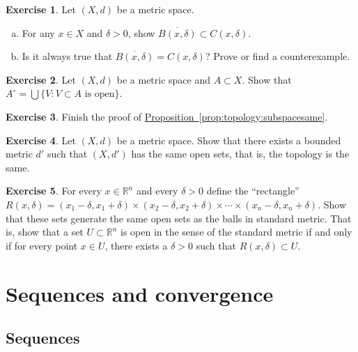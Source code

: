 \documentclass[12pt,openany]{book}
\newcommand{\R}{{\mathbb{R}}}
\theoremstyle{plain}
\theoremstyle{remark}
\theoremstyle{definition}
\newenvironment{exbox}{%
    \def\FrameCommand{\vrule width 1pt \relax\hspace{10pt}}%
    \MakeFramed{\advance\hsize-\width\FrameRestore}%
}{%
    \endMakeFramed
}
\newenvironment{exparts}{%
    \leavevmode\begin{enumerate}[a),noitemsep,topsep=0pt,parsep=0pt,partopsep=0pt]
}{%
    \end{enumerate}
}
\theoremstyle{exercise}
\newtheorem{exercise}{Exercise}[section]
\theoremstyle{example}
\newcommand{\propref}[1]{\hyperref[#1]{Proposition~\ref*{#1}}}
\begin{document}
\begin{exbox}
\begin{samepage}
\begin{exercise}
Let $(X,d)$ be a metric space.
\begin{exparts}
\item
For any $x \in X$ and $\delta > 0$, show
$\overline{B(x,\delta)} \subset C(x,\delta)$.
\item
Is it always true that
$\overline{B(x,\delta)} = C(x,\delta)$?  Prove or find a counterexample.
\end{exparts}
\end{exercise}
\end{samepage}

\begin{exercise}
Let $(X,d)$ be a metric space and $A \subset X$.  Show that
$A^\circ = \bigcup \{ V : V \subset A \text{ is open} \}$.
\end{exercise}

\begin{exercise}
Finish the proof of \propref{prop:topology:subspacesame}.
\end{exercise}

\begin{exercise}
Let $(X,d)$ be a metric space.  Show that there exists a bounded metric
$d'$ such that $(X,d')$ has the same open sets, that is, the topology is
the same.
\end{exercise}

\begin{exercise}
For every $x \in \R^n$ and every $\delta > 0$ define the ``rectangle''
$R(x,\delta) =
(x_1-\delta,x_1+\delta) \times
(x_2-\delta,x_2+\delta) \times \cdots \times
(x_n-\delta,x_n+\delta)$.  Show that these sets generate the same open
sets as the balls in standard metric.  That is, show that a set $U \subset \R^n$
is open in the sense of the standard metric if and only if for every
point $x \in U$, there exists a $\delta > 0$ such that $R(x,\delta) \subset
U$.
\end{exercise}
\end{exbox}


\section{Sequences and convergence}
\label{sec:metseqs}

\subsection{Sequences}
\end{document}
